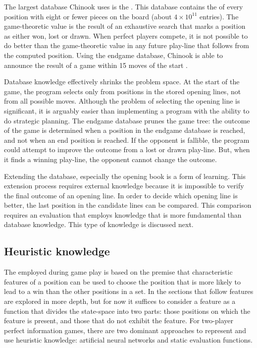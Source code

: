 The largest database Chinook uses is the .  This database contains the  of every position with eight or fewer pieces on the board (about  $4 \times 10 ^{11}$ entries). The game-theoretic value is the result of an exhaustive search that marks a position as either won, lost or drawn.  When perfect players compete, it is not possible to do better than the game-theoretic value in any future play-line that follows from the computed position.  Using the endgame database, Chinook is able to announce the result of a game within 15 moves of the start \cite{schaeffer:games}.

Database knowledge effectively shrinks the problem space.  At the start of the game, the program selects only from positions in the stored opening lines, not from all possible moves.  Although the problem of selecting the opening line is significant, it is arguably easier than implementing a program with the ability to do strategic planning.  The endgame database prunes the game tree: the outcome of the game is determined when a position in the endgame database is reached, and not when an end position is reached.  If the opponent is fallible, the program could attempt to improve the outcome from a lost or drawn play-line. But, when it finds a winning play-line, the opponent cannot change the outcome.
 
Extending the database, especially the opening book is a form of learning.  This extension process requires external knowledge because it is impossible to verify the final outcome of an opening line.  In order to decide which opening line is better, the last position in the candidate lines can be compared.  This comparison requires an evaluation that employs knowledge that is more fundamental than database knowledge.  This type of knowledge is discussed next.

\subsection{Heuristic knowledge}
\label{sec:heuristic}
The  employed during game play is based on the premise that characteristic features of a position can be used to choose the position that is more likely to lead to a win than the other positions in a set.  In the sections that follow features are explored in more depth, but for now it suffices to consider a feature as a function that divides the state-space into two parts:  those positions on which the feature is present, and those that do not exhibit the feature.   For two-player perfect information games, there are two dominant approaches to represent and use heuristic knowledge: artificial neural networks and static evaluation functions.  

